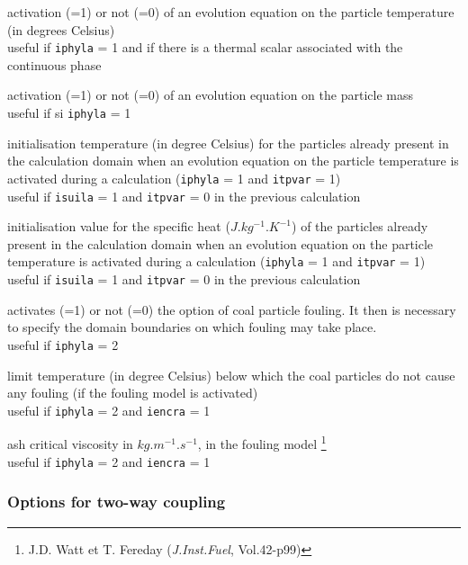 {activation (=1) or not (=0) of an evolution equation on the particle
temperature (in degrees Celsius)\\
useful if \texttt{iphyla} = 1 and if there is a thermal scalar associated with
the continuous phase}

{activation (=1) or not (=0) of an evolution equation on the
particle mass\\
useful if si \texttt{iphyla} = 1}

{initialisation temperature (in degree Celsius) for the particles already
present in the calculation domain when an evolution equation on
the particle temperature is activated during a calculation (\texttt{iphyla} =
1 and \texttt{itpvar} = 1)\\
useful if \texttt{isuila} = 1 and \texttt{itpvar} = 0 in the previous
calculation}

{initialisation value for the specific heat ($J.kg^{-1}.K^{-1}$) of the
particles already present in the calculation domain when an evolution equation
on the particle temperature is activated during a calculation
(\texttt{iphyla} = 1 and \texttt{itpvar} = 1)\\
useful if \texttt{isuila} = 1 and \texttt{itpvar} = 0 in the previous calculation}

{activates (=1) or not (=0) the option of coal particle
fouling. It then is necessary to specify the domain boundaries
on which fouling may take place.\\
useful if \texttt{iphyla} = 2}

{limit temperature (in degree Celsius) below which the coal particles do
not cause any fouling (if the fouling model is activated)\\
useful if \texttt{iphyla} = 2 and \texttt{iencra} = 1}

{ash critical viscosity in $kg.m^{-1}.s^{-1}$, in the fouling model
\footnote{J.D. Watt
et T. Fereday (\textit{J.Inst.Fuel}, Vol.42-p99)}\\
useful if \texttt{iphyla} = 2 and \texttt{iencra} = 1}

\subsubsection{Options for two-way coupling}

